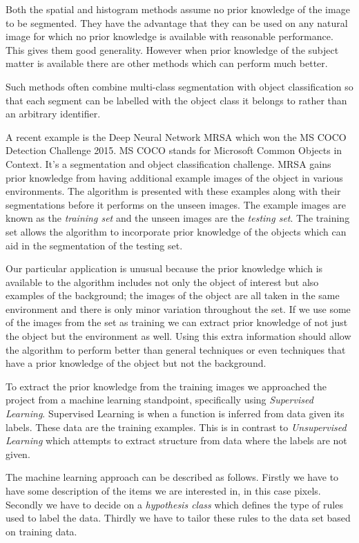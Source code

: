 \documentclass[12pt]{IIBproject}
\begin{document}
 Both the spatial and histogram methods assume no prior knowledge of the image to be segmented. They have the advantage that they can be used on any natural image for which no prior knowledge is available with reasonable performance. This gives them good generality. However when prior knowledge of the subject matter is available there are other methods which can perform much better. 
 
 Such methods often combine multi-class segmentation with object classification so that each segment can be labelled with the object class it belongs to rather than an arbitrary identifier. 
 
 A recent example is the Deep Neural Network MRSA\cite{he2015deep} which won the MS COCO Detection Challenge 2015\cite{mscoco}. MS COCO stands for Microsoft Common Objects in Context. It's a segmentation and object classification challenge. MRSA gains prior knowledge from having additional example images of the object in various environments. The algorithm is presented with these examples along with their segmentations before it performs on the unseen images. The example images are known as the \emph{training set} and the unseen images are the \emph{testing set}. The training set allows the algorithm to incorporate prior knowledge of the objects which can aid in the segmentation of the testing set.

Our particular application is unusual because the prior knowledge which is available to the algorithm includes not only the object of interest but also examples of the background; the images of the object are all taken in the same environment and there is only minor variation throughout the set. If we use some of the images from the set as training we can extract prior knowledge of not just the object but the environment as well. Using this extra information should allow the algorithm to perform better than general techniques or even techniques that have a prior knowledge of the object but not the background. 

To extract the prior knowledge from the training images we approached the project from a machine learning standpoint, specifically using \emph{Supervised Learning}. Supervised Learning is when a function is inferred from data given its labels. These data are the training examples. This is in contrast to \emph{Unsupervised Learning} which attempts to extract structure from data where the labels are not given. 

The machine learning approach can be described as follows. Firstly we have to have some description of the items we are interested in, in this case pixels. Secondly we have to decide on a \emph{hypothesis class} which defines the type of rules used to label the data. Thirdly we have to tailor these rules to the data set based on training data. 
\end{document}
